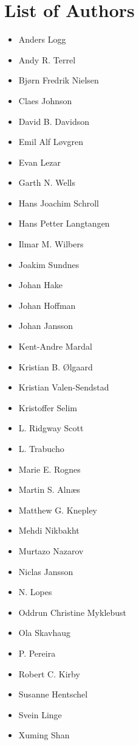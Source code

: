 \chapter*{List of Authors}



\begin{itemize}
\item
  Anders Logg
\item
  Andy R. Terrel
\item
  Bj\o{}rn Fredrik Nielsen
\item
  Claes Johnson
\item
  David B. Davidson
\item
  Emil Alf L{\o}vgren
\item
  Evan Lezar
\item
  Garth N. Wells
\item
  Hans Joachim Schroll
\item
  Hans Petter Langtangen
\item
  Ilmar M. Wilbers
\item
  Joakim Sundnes
\item
  Johan Hake
\item
  Johan Hoffman
\item
  Johan Jansson
\item
  Kent-Andre Mardal
\item
  Kristian B. \O{}lgaard
\item
  Kristian Valen-Sendstad
\item
  Kristoffer Selim
\item
  L. Ridgway Scott
\item
  L. Trabucho
\item
  Marie E. Rognes
\item
  Martin S. Aln{\ae}s
\item
  Matthew G. Knepley
\item
  Mehdi Nikbakht
\item
  Murtazo Nazarov
\item
  Niclas Jansson
\item
  N. Lopes
\item
  Oddrun Christine Myklebust
\item
  Ola Skavhaug
\item
  P. Pereira
\item
  Robert C. Kirby
\item
  Susanne Hentschel
\item
  Svein Linge
\item
  Xuming Shan
\end{itemize}
